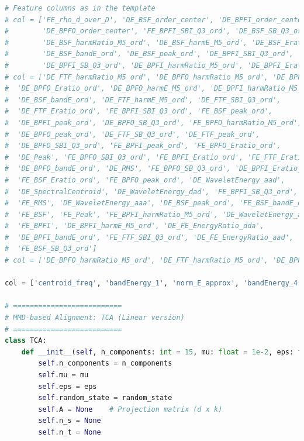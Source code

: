 \documentclass[a4paper]{CPIPC}
\numberwithin{equation}{section}
\begin{document}
\begin{lstlisting}[language=Python, caption=Transfer Learning with TCA]
# Feature columns as in the template
# col = ['FE_rho_d_over_D', 'DE_BSF_order_center', 'DE_BPFI_order_center',
#        'DE_BPFO_order_center', 'FE_BPFI_SBI_Q3_ord', 'DE_BSF_SB_Q3_ord',
#        'DE_BSF_harmRatio_M5_ord', 'DE_BSF_harmE_M5_ord', 'DE_BSF_Eratio_ord',
#        'DE_BSF_bandE_ord', 'DE_BSF_peak_ord', 'DE_BPFI_SBI_Q3_ord',
#        'DE_BPFI_SB_Q3_ord', 'DE_BPFI_harmRatio_M5_ord', 'DE_BPFI_Eratio_ord']
# col = ['DE_FTF_harmRatio_M5_ord', 'DE_BPFO_harmRatio_M5_ord', 'DE_BPFI_SBI_Q3_ord',
#  'DE_BPFO_Eratio_ord', 'DE_BPFO_harmE_M5_ord', 'DE_BPFI_harmRatio_M5_ord',
#  'DE_BSF_bandE_ord', 'DE_FTF_harmE_M5_ord', 'DE_FTF_SBI_Q3_ord',
#  'DE_FTF_Eratio_ord', 'FE_BPFI_SBI_Q3_ord', 'FE_BSF_peak_ord',
#  'DE_BPFI_peak_ord', 'DE_BPFO_SB_Q3_ord', 'FE_BPFO_harmRatio_M5_ord',
#  'DE_BPFO_peak_ord', 'DE_FTF_SB_Q3_ord', 'DE_FTF_peak_ord',
#  'DE_BPFO_SBI_Q3_ord', 'FE_BPFI_peak_ord', 'FE_BPFO_Eratio_ord',
#  'DE_Peak', 'FE_BPFO_SBI_Q3_ord', 'FE_BPFI_Eratio_ord', 'FE_FTF_Eratio_ord',
#  'DE_BPFO_bandE_ord', 'DE_RMS', 'FE_BPFO_SB_Q3_ord', 'DE_BPFI_Eratio_ord',
#  'FE_BSF_Eratio_ord', 'FE_BPFO_peak_ord', 'DE_WaveletEnergy_aad',
#  'DE_SpectralCentroid', 'DE_WaveletEnergy_dad', 'FE_BPFI_SB_Q3_ord',
#  'FE_RMS', 'DE_WaveletEnergy_aaa', 'DE_BSF_peak_ord', 'FE_BSF_bandE_ord',
#  'FE_BSF', 'FE_Peak', 'FE_BPFI_harmRatio_M5_ord', 'DE_WaveletEnergy_add',
#  'FE_BPFI', 'DE_BPFI_harmE_M5_ord', 'DE_FE_EnergyRatio_dda',
#  'DE_BPFI_bandE_ord', 'FE_FTF_SBI_Q3_ord', 'DE_FE_EnergyRatio_aad',
#  'FE_BSF_SB_Q3_ord']
# col = ['DE_BPFO_harmRatio_M5_ord', 'DE_FTF_harmRatio_M5_ord', 'DE_BPFI_SBI_Q3_ord','DE_BPFO_harmE_M5_ord', 'DE_BPFO_Eratio_ord', 'DE_BPFI_harmRatio_M5_ord','DE_BSF_bandE_ord', 'DE_FTF_SBI_Q3_ord', 'FE_BPFI_SBI_Q3_ord','DE_FTF_harmE_M5_ord', 'FE_BSF_peak_ord', 'DE_FTF_Eratio_ord','DE_BPFO_SBI_Q3_ord', 'DE_BPFI_peak_ord', 'FE_BPFO_harmRatio_M5_ord','FE_BSF_Eratio_ord', 'FE_BPFO_Eratio_ord', 'DE_BPFO_peak_ord','DE_WaveletEnergy_aad', 'FE_FTF_Eratio_ord', 'DE_FTF_peak_ord','FE_BPFI_harmRatio_M5_ord', 'DE_RMS', 'DE_BPFO_SB_Q3_ord','FE_BPFO_SBI_Q3_ord', 'DE_Peak', 'FE_BPFI_peak_ord', 'DE_BPFI_harmE_M5_ord','DE_BPFI_Eratio_ord', 'DE_FE_EnergyRatio_aaa']

col = ['centroid_freq', 'bandEnergy_1', 'norm_E_approx', 'bandEnergy_4', 'bandEnergy_6','bsf_energy', 'bpfi_energy', 'bandEnergy_5', 'norm_E_d1', 'mean_freq'];

# ==========================
# MMD-based Alignment: TCA (Linear version)
# ==========================
class TCA:
    def __init__(self, n_components: int = 15, mu: float = 1e-2, eps: float = 1e-6, random_state: int = 42):
        self.n_components = n_components
        self.mu = mu
        self.eps = eps
        self.random_state = random_state
        self.A = None    # Projection matrix (d x k)
        self.n_s = None
        self.n_t = None


\end{lstlisting}
\end{document}
